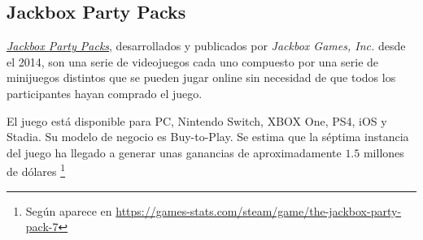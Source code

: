 \subsection{Jackbox Party Packs}

\href{https://www.jackboxgames.com/}{\emph{Jackbox Party Packs}}, desarrollados
y publicados por \emph{Jackbox Games, Inc.} desde el 2014, son una serie de
videojuegos cada uno compuesto por una serie de minijuegos distintos que se
pueden jugar online sin necesidad de que todos los participantes hayan comprado
el juego.

El juego está disponible para PC, Nintendo Switch, XBOX One, PS4, iOS y Stadia.
Su modelo de negocio es Buy-to-Play. Se estima que la séptima instancia del
juego ha llegado a generar unas ganancias de aproximadamente $1.5$ millones de
dólares \footnote{Según aparece en
\url{https://games-stats.com/steam/game/the-jackbox-party-pack-7}}

